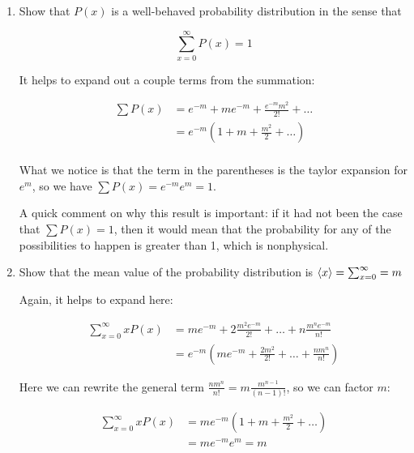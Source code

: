 \documentclass{article}
\begin{document}
\begin{enumerate}[label=(\alph*)]
    \item Show that $P(x)$ is a well-behaved probability distribution in the sense that
    
    \[ \sum_{x= 0}^\infty P(x) = 1\] 

    \begin{solution}
        It helps to expand out a couple terms from the summation:

        \begin{align*}
            \sum P(x) &= e^{-m} + me^{-m} + \frac{e^{-m} m^2}{2!} + \dots\\
            &= e^{-m}\left(1 + m + \frac{m^2}{2} + \dots \right)\\
        \end{align*}

        What we notice is that the term in the parentheses is the taylor expansion for $e^{m}$, so we have $\sum P(x) = e^{-m}e^{m} = 1$.

        A quick comment on why this result is important: if it had not been the case that $\sum P(x) = 1$, then it would mean that the probability for any of the possibilities to happen is greater than 1, which is nonphysical.
    \end{solution}

    \item Show that the mean value of the probability distribution is $\langle x \rangle = \sum_{x = 0}^\infty = m$
    
    \begin{solution}
        Again, it helps to expand here:

        \begin{align*}
            \sum_{x = 0}^\infty xP(x) &= me^{-m} + 2\frac{m^2e^{-m}}{2!} + \dots + n\frac{{m^n}e^{-m}}{n!}\\
            &= e^{-m} \left(me^{-m} + \frac{2m^2}{2!} + \dots + \frac{nm^n}{n!}\right)
        \end{align*}

        Here we can rewrite the general term $\frac{nm^n}{n!} = m \frac{m^{n-1}}{(n-1)!}$, so we can factor $m$:

        \begin{align*}
            \sum_{x = 0}^\infty xP(x) &= me^{-m} \left(1 + m + \frac{m^2}{2} + \dots \right)\\
            &= m e^{-m}e^{m} = m
        \end{align*}


\end{solution}
\end{enumerate}
\end{document}
